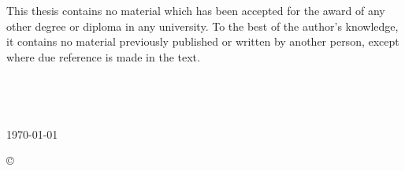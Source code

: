 \begin{titlepage}
\vspace*{\fill}
\noindent
This thesis contains no material which has been accepted for the award of any other degree or diploma in any university. To the best of the author’s knowledge, it contains no material previously published or written by another person, except where due reference is made in the text.
\\
\\
\\
\\
\hspace*{\fill}\THEAUTHOR \\
\hspace*{\fill}\today
	\vspace*{\fill}
\begin{center}
	\copyright\THEAUTHOR
\end{center}

\end{titlepage}